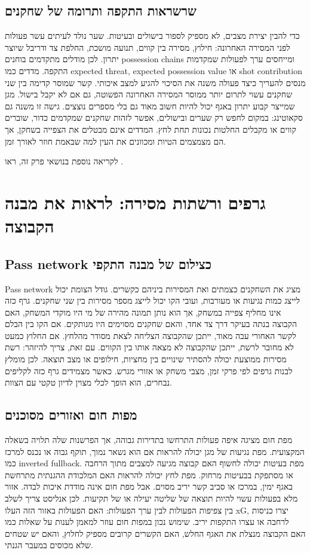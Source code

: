 \documentclass[11pt]{report}
\begin{document}
\section{שרשראות התקפה ותרומה של שחקנים}
כדי להבין יצירת מצבים, לא מספיק לספור בישולים ובעיטות. שער נולד לעיתים עשר פעולות לפני המסירה האחרונה: חילוץ, מסירה בין קווים, תנועה מושכת, החלפת צד ודריבל שיוצר יתרון. לכן מודלים מתקדמים בוחנים possession chains ומייחסים ערך לפעולות שמקדמות התקפה. מדדים כמו expected threat, expected possession value או shot contribution מנסים להעריך כיצד פעולה משנה את הסיכוי להגיע למצב איכותי. קשר שמוסר קדימה בין שני שחקנים עשוי לתרום יותר ממוסר המסירה האחרונה הפשוטה, גם אם לא יקבל בישול. מגן שמייצר קבוע יתרון באגף יכול להיות חשוב מאוד גם בלי מספרים נוצצים. גישה זו משנה גם סקאוטינג: במקום לחפש רק שערים ובישולים, אפשר לזהות שחקנים שמקדמים כדור, שוברים קווים או מקבלים החלטות נכונות תחת לחץ. המדדים אינם מבטלים את הצפייה בשחקן, אך הם מצמצמים הטיות ומכוונים את העין למה שבאמת חוזר לאורך זמן.

לקריאה נוספת בנושאי פרק זה, ראו \cite{latex_project}.

\chapter{גרפים ורשתות מסירה: לראות את מבנה הקבוצה}
\section{Pass network כצילום של מבנה התקפי}
Pass network מציג את השחקנים כצמתים ואת המסירות ביניהם כקשרים. גודל הצומת יכול לייצג כמות נגיעות או מעורבות, ועובי הקו יכול לייצג מספר מסירות בין שני שחקנים. גרף כזה אינו מחליף צפייה במשחק, אך הוא נותן תמונה מהירה של מי היו מוקדי המשחק, האם הקבוצה בנתה בעיקר דרך צד אחד, והאם שחקנים מסוימים היו מנותקים. אם הקו בין הבלם לקשר האחורי עבה מאוד, ייתכן שהקבוצה הצליחה לצאת מסודר מהלחץ. אם החלוץ כמעט לא מחובר לרשת, ייתכן שהקבוצה לא מצאה אותו בין הקווים. עם זאת, צריך להיזהר: רשת מסירות ממוצעת יכולה להסתיר שינויים בין מחציות, חילופים או מצב תוצאה. לכן מומלץ לבנות גרפים לפי פרקי זמן, מצבי משחק או אזורי מגרש. כאשר מצמידים גרף כזה לקליפים נבחרים, הוא הופך לכלי מצוין לדיון טקטי עם הצוות.

\section{מפות חום ואזורים מסוכנים}
מפת חום מציגה איפה פעולות התרחשו בתדירות גבוהה, אך הפרשנות שלה תלויה בשאלה המקצועית. מפת נגיעות של מגן יכולה להראות אם הוא נשאר נמוך, תוקף גבוה או נכנס למרכז כמו inverted fullback. מפת בעיטות יכולה לחשוף האם קבוצה מגיעה למצבים מתוך הרחבה או מסתפקת בבעיטות מרחוק. מפת לחץ יכולה להראות האם המלכודת ההגנתית מתרחשת באגף ימין, במרכז או סביב קשר יריב מסוים. אבל מפת חום אינה מודדת איכות לבדה. אזור מלא בפעולות עשוי להיות תוצאה של שליטה יעילה או של תקיעות. לכן אנליסט צריך לשלב בין צפיפות הפעולות לבין ערך הפעולות: האם הפעולות באזור הזה העלו xG, יצרו כניסות לרחבה או עצרו התקפות יריב. שימוש נכון במפות חום עוזר למאמן לענות על שאלות כמו האם הקבוצה מנצלת את האגף החלש, האם הקשרים קרובים מספיק לחלוץ, והאם יש שטחים שלא מכוסים במעבר הגנתי.
\end{document}
